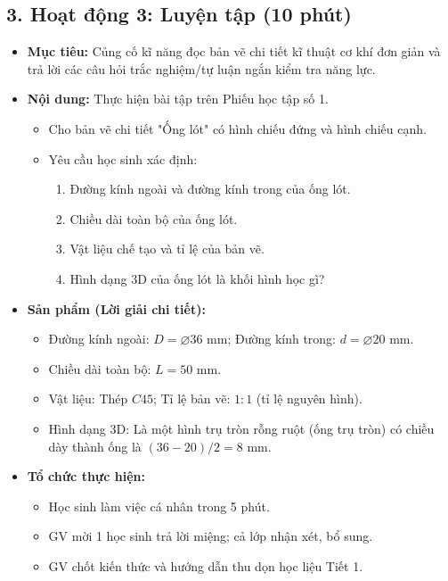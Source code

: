\documentclass[12pt, a4paper]{article}
\begin{document}
\subsection*{3. Hoạt động 3: Luyện tập (10 phút)}

\begin{itemize}[leftmargin=1.2cm]
    \item[a)] \textbf{Mục tiêu:} Củng cố kĩ năng đọc bản vẽ chi tiết kĩ thuật cơ khí đơn giản và trả lời các câu hỏi trắc nghiệm/tự luận ngắn kiểm tra năng lực.
    \item[b)] \textbf{Nội dung:} Thực hiện bài tập trên Phiếu học tập số 1.
    \begin{itemize}[leftmargin=0.6cm]
        \item Cho bản vẽ chi tiết "Ống lót" có hình chiếu đứng và hình chiếu cạnh.
        \item Yêu cầu học sinh xác định:
        \begin{enumerate}[leftmargin=0.6cm]
            \item Đường kính ngoài và đường kính trong của ống lót.
            \item Chiều dài toàn bộ của ống lót.
            \item Vật liệu chế tạo và tỉ lệ của bản vẽ.
            \item Hình dạng 3D của ống lót là khối hình học gì?
        \end{enumerate}
    \end{itemize}

    \item[c)] \textbf{Sản phẩm (Lời giải chi tiết):}
    \begin{itemize}[leftmargin=0.6cm]
        \item Đường kính ngoài: $D = \varnothing 36\text{ mm}$; Đường kính trong: $d = \varnothing 20\text{ mm}$.
        \item Chiều dài toàn bộ: $L = 50\text{ mm}$.
        \item Vật liệu: Thép $C45$; Tỉ lệ bản vẽ: $1:1$ (tỉ lệ nguyên hình).
        \item Hình dạng 3D: Là một hình trụ tròn rỗng ruột (ống trụ tròn) có chiều dày thành ống là $(36 - 20)/2 = 8\text{ mm}$.
    \end{itemize}

    \item[d)] \textbf{Tổ chức thực hiện:}
    \begin{itemize}[leftmargin=0.6cm]
        \item Học sinh làm việc cá nhân trong 5 phút.
        \item GV mời 1 học sinh trả lời miệng; cả lớp nhận xét, bổ sung.
        \item GV chốt kiến thức và hướng dẫn thu dọn học liệu Tiết 1.
    \end{itemize}
\end{itemize}
\end{document}
